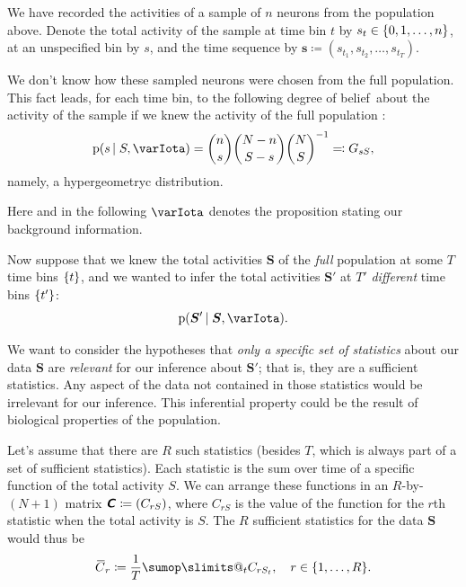 \documentclass[\ifafour a4paper,12pt,\else a5paper,10pt,\fi%
onecolumn,oneside,article,%
british%
]{memoir}
\makeatletter
\theoremstyle{remark}
\theoremstyle{innote}
\def\sum{\DOTSI\sumop\slimits@}
\newcommand*{\mathte}[1]{\textbf{\textit{\textsf{#1}}}}
\newcommand*{\citep}{\parencites}
\newcommand*{\defd}{\coloneqq}
\newcommand*{\defs}{\eqqcolon}
\DeclarePairedDelimiter\set{\{}{\}}
\newcommand*{\pf}{\mathrm{p}}%
\renewcommand*{\|}{\nonscript\,\vert\nonscript\;\mathopen{}}
\newcommand*{\sect}{\S}%
\newcommand*{\widebar}[1]{{\mkern1.5mu\skew{2}\overline{\mkern-1.5mu#1\mkern-1.5mu}\mkern 1.5mu}}
\newcommand*{\dob}{degree of belief}
\newcommand*{\yS}{S}
\newcommand*{\ySt}{\bm{\yS}}
\newcommand*{\ys}{s}
\newcommand*{\yst}{\bm{\ys}}
\newcommand*{\yC}{\mathte{C}}
\newcommand*{\ycc}{\widebar{C}}
\newcommand*{\yI}{\varIota}
\makeatother
\begin{document}
We have recorded the activities of a sample of $n$ neurons from the
population above. Denote the total activity of the sample at time bin $t$
by $\ys_{t} \in \set{0,1,\dotsc,n}$, at an unspecified bin by $\ys$, and the
time sequence by $\yst \defd ( \ys_{t_1}, \ys_{t_2}, \dotsc, \ys_{t_T} )$.


We don't know how these sampled neurons were chosen from the full
population. This fact leads, for each time bin, to the following \dob\
about the activity of the sample if we knew the activity of the
full population \citep[\sect~2.3]{portamanaetal2015}[\sect~2]{portamanaetal2018b}:
\begin{equation}
  \label{eq:dob_sample_given_pop}
  \pf(\ys \| \yS, \yI) = \binom{n}{\ys} \binom{N-n}{\yS-\ys} \binom{N}{\yS}^{-1}
  \defs G_{\ys\yS},
\end{equation}
namely, a hypergeometryc distribution.

Here and in the following $\yI$ denotes the proposition stating our
background information.

\bigskip

Now suppose that we knew the total activities $\ySt$ of the \emph{full}
population at some $T$ time bins $\set{t}$, and we wanted to infer the
total activities $\ySt'$ at $T'$ \emph{different} time bins $\set{t'}$:
\begin{equation}
  \label{eq:goal_new_bins_from_known}
  \pf(\ySt' \| \ySt, \yI).
\end{equation}

We want to consider the hypotheses that \emph{only a specific set of
  statistics} about our data $\ySt$ are \emph{relevant} for our inference
about $\ySt'$; that is, they are a sufficient statistics. Any aspect of the
data not contained in those statistics would be irrelevant for our
inference. This inferential property could be the result of biological
properties of the population.

Let's assume that there are $R$ such statistics (besides $T$, which is
always part of a set of sufficient statistics). Each statistic is the sum
over time of a specific function of the total activity $\yS$. We can
arrange these functions in an $R$-by-$(N+1)$ matrix $\yC \defd (C_{r\yS})$,
where $C_{r\yS}$ is the value of the function for the $r$th statistic when
the total activity is $\yS$. The $R$ sufficient statistics for the data
$\ySt$ would thus be
\begin{equation}
  \label{eq:suff_statistics_t}
\ycc_{r} \defd  \frac{1}{T}\sum_{t} C_{r\yS_{t}},\quad r \in \set{1, \dotsc, R}.
\end{equation}
\end{document}
